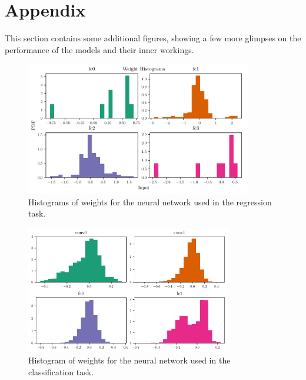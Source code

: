 \documentclass[11pt,a4paper]{scrartcl}
\begin{document}
\printbibliography

\clearpage

\section*{Appendix}
This section contains some additional figures, showing a few more glimpses on the performance of the models and their inner workings.

\begin{figure}[htp]
    \centering
    \includegraphics[width=0.88\textwidth]{../01_Regression/Plots/regression_weight_hist}
    \caption{Histograms of weights for the neural network used in the regression task.\label{fig:weight_hist_regression}}
\end{figure}

\begin{figure}[htp]
    \centering
    \includegraphics[width=0.8\textwidth]{../02_Classification/Plots/weight_histogram}
    \caption{Histogram of weights for the neural network used in the classification task.\label{fig:weight_hist_cnn}}
\end{figure}
\end{document}
